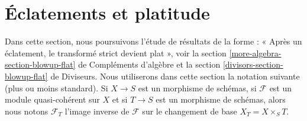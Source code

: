 \section{Éclatements et platitude}
\label{section-blowup-flat}

\noindent
Dans cette section, nous poursuivons l'étude de résultats de la forme : « Après un
éclatement, le transformé strict devient plat », voir la
section \ref{more-algebra-section-blowup-flat} de Compléments d'algèbre et la
section \ref{divisors-section-blowup-flat} de Diviseurs.
Nous utiliserons dans cette section la notation suivante
(plus ou moins standard). Si $X \to S$ est
un morphisme de schémas, si $\mathcal{F}$ est un module quasi-cohérent
sur $X$ et si $T \to S$ est un morphisme de schémas, alors nous notons
$\mathcal{F}_T$ l'image inverse de $\mathcal{F}$ sur le changement de base
$X_T = X \times_S T$.

